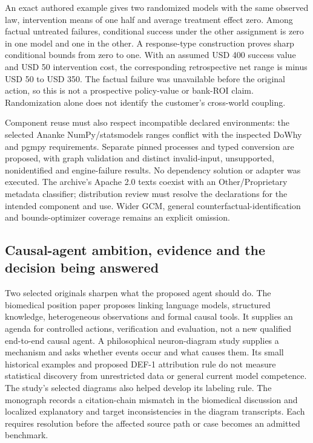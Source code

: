 An exact authored example gives two randomized models with the same
observed law, intervention means of one half and average treatment
effect zero. Among factual untreated failures, conditional success under
the other assignment is zero in one model and one in the other. A
response-type construction proves sharp conditional bounds from zero to
one. With an assumed USD 400 success value and USD 50 intervention cost,
the corresponding retrospective net range is minus USD 50 to USD 350.
The factual failure was unavailable before the original action, so this
is not a prospective policy-value or bank-ROI claim. Randomization alone
does not identify the customer's cross-world coupling.
\citep{exec18_pyid_coupling}

Component reuse must also respect incompatible declared environments:
the selected Ananke NumPy/statsmodels ranges conflict with the inspected
DoWhy and pgmpy requirements. Separate pinned processes and typed
conversion are proposed, with graph validation and distinct
invalid-input, unsupported, nonidentified and engine-failure results. No
dependency solution or adapter was executed. The archive's Apache 2.0
texts coexist with an Other/Proprietary metadata classifier;
distribution review must resolve the declarations for the intended
component and use. Wider GCM, general counterfactual-identification and
bounds-optimizer coverage remains an explicit omission.
\citep{exec18_pyid_graph,exec18_pyid_metadata,exec18_pyid_license,exec18_pyid_contract}

\hypertarget{causal-agent-ambition-evidence-and-the-decision-being-answered}{%
\subsection{Causal-agent ambition, evidence and the decision being
answered}\label{causal-agent-ambition-evidence-and-the-decision-being-answered}}

Two selected originals sharpen what the proposed agent should do. The
biomedical position paper proposes linking language models, structured
knowledge, heterogeneous observations and formal causal tools. It
supplies an agenda for controlled actions, verification and evaluation,
not a new qualified end-to-end causal agent. A philosophical
neuron-diagram study supplies a mechanism and asks whether events occur
and what causes them. Its small historical examples and proposed DEF-1
attribution rule do not measure statistical discovery from unrestricted
data or general current model competence. The study's selected diagrams
also helped develop its labeling rule. The monograph records a
citation-chain mismatch in the biomedical discussion and localized
explanatory and target inconsistencies in the diagram transcripts. Each
requires resolution before the affected source path or case becomes an
admitted benchmark.
\citep{exec18_reasoning_biomedical,exec18_reasoning_neuron}

